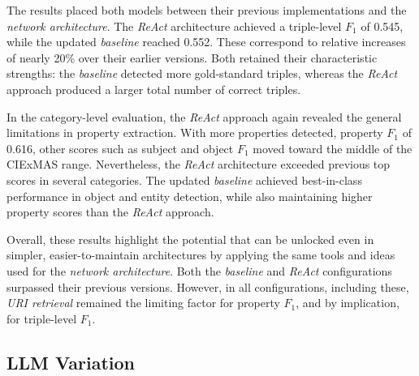 \documentclass[a4paper,oneside,bibliography=totoc]{scrbook}
\begin{document}
The results placed both models between their previous implementations and the \textit{network architecture}. The \textit{ReAct} architecture achieved a triple-level $F_{1}$ of 0.545, while the updated \textit{baseline} reached 0.552. These correspond to relative increases of nearly 20\% over their earlier versions. Both retained their characteristic strengths: the \textit{baseline} detected more gold-standard triples, whereas the \textit{ReAct} approach produced a larger total number of correct triples.

In the category-level evaluation, the \textit{ReAct} approach again revealed the general limitations in property extraction. With more properties detected, property $F_{1}$ of 0.616, other scores such as subject and object $F_{1}$ moved toward the middle of the CIExMAS range. Nevertheless, the \textit{ReAct} architecture exceeded previous top scores in several categories. The updated \textit{baseline} achieved best-in-class performance in object and entity detection, while also maintaining higher property scores than the \textit{ReAct} approach.

Overall, these results highlight the potential that can be unlocked even in simpler, easier-to-maintain architectures by applying the same tools and ideas used for the \textit{network architecture}. Both the \textit{baseline} and \textit{ReAct} configurations surpassed their previous versions. However, in all configurations, including these, \textit{URI retrieval} remained the limiting factor for property $F_{1}$, and by implication, for triple-level $F_{1}$.


\subsection{LLM Variation}
\label{subsec:llm_model_variation}
\end{document}
